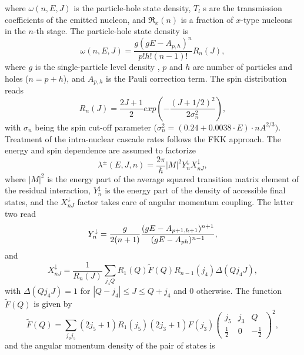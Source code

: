\noindent where $\omega (n,E,J)$ is the particle-hole state density, $T_{l}$%
s are the transmission coefficients of the emitted nucleon, and $\Re _{x}(n)$
is a fraction of $x$-type nucleons in the $n$-th stage. The particle-hole
state density is
\begin{equation}
\omega (n,E,J)=\frac{g(gE-A_{p,h})^{n}}{p!h!(n-1)!}R_{n}(J),
\end{equation}%
\noindent where $g$ is the single-particle level density%
, $p$ and $h$ are number of particles and holes ($%
n=p+h$), and $A_{p,h}$ is the Pauli correction term. The spin distribution
reads
\begin{equation}
R_{n}(J)=%
\frac{2J+1}{2}exp\left( -\frac{(J+1/2)^{2}}{2\sigma _{n}^{2}}\right) ,
\end{equation}%
with $\sigma _{n}$ being the spin cut-off parameter ($\sigma
_{n}^{2}=(0.24+0.0038\cdot E)\cdot nA^{2/3}).$ Treatment of the intra-nuclear
cascade rates follows the FKK \cite{FKK} approach. The energy and spin
dependence are assumed to factorize
\begin{equation}
\lambda ^{\pm }(E,J,n)=\frac{2\pi }{\hbar }|M|^{2}Y_{n}^{\downarrow
}X_{nJ}^{\downarrow },
\end{equation}%
\noindent where $|M|^{2}$ is the energy part of the average squared
transition matrix element of the residual interaction, $Y_{n}^{\downarrow }$
is the energy part of the density of accessible final states, and the $%
X_{nJ}^{\downarrow }$ factor takes care of angular momentum coupling. The
latter two read
\begin{equation}
Y_{n}^{\downarrow }=\frac{g}{2(n+1)}\frac{(gE-A_{p+1,h+1})^{n+1}}{%
(gE-A_{ph})^{n-1}},
\end{equation}%
and
\begin{equation}
X_{nJ}^{\downarrow }=\frac{1}{R_{n}(J)}\sum_{j_{4}Q}R_{1}(Q)\widetilde{F}%
(Q)R_{n-1}(j_{4})\Delta (Qj_{4}J),
\end{equation}%
with $\Delta (Qj_{4}J)=1$ for $|Q-j_{4}|\leq J\leq Q+j_{4}$ and 0 otherwise.
The function $\widetilde{F}(Q)$ is given by
\begin{equation}
\widetilde{F}(Q)=\sum_{j_{3}j_{5}}(2j_{5}+1)R_{1}(j_{5})(2j_{3}+1)F(j_{3})%
\left(
\begin{array}{ccc}
j_{5} & j_{3} & Q \\
\frac{1}{2} & 0 & -\frac{1}{2}%
\end{array}%
\right) ^{2},
\end{equation}%
and the angular momentum density of the pair of states is

